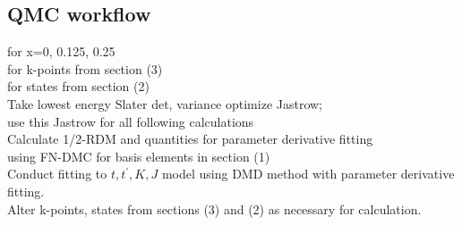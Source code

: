 \documentclass{article}
\begin{document}
\subsection{QMC workflow}
for x=0, 0.125, 0.25 \\
\indent for k-points from section (3) \\ 
\indent \indent for states from section (2) \\
\indent \indent \indent Take lowest energy Slater det, variance optimize Jastrow;\\
\indent \indent \indent use this Jastrow for all following calculations
\\

\indent \indent \indent Calculate 1/2-RDM and quantities for parameter derivative fitting \\ 
\indent \indent \indent using FN-DMC for basis elements in section (1)\\

\noindent Conduct fitting to $t,t^\prime, K,J$ model using DMD method with parameter derivative fitting. \\

\noindent Alter k-points, states from sections (3) and (2) as necessary for calculation.  
\end{document}
